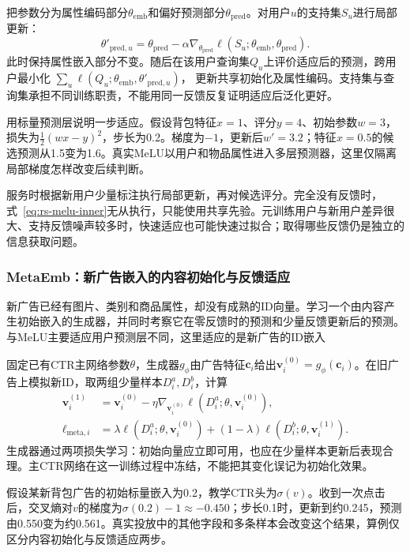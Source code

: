 把参数分为属性编码部分$\theta_{\mathrm{emb}}$和偏好预测部分$\theta_{\mathrm{pred}}$。对用户$u$的支持集$S_u$进行局部更新：
\begin{equation}
  \theta'_{\mathrm{pred},u}=
  \theta_{\mathrm{pred}}-\alpha\nabla_{\theta_{\mathrm{pred}}}
     \ell(S_u;\theta_{\mathrm{emb}},\theta_{\mathrm{pred}}).
  \label{eq:rs-melu-inner}
\end{equation}
此时保持属性嵌入部分不变。随后在该用户查询集$Q_u$上评价适应后的预测，跨用户最小化
$\sum_u\ell(Q_u;\theta_{\mathrm{emb}},\theta'_{\mathrm{pred},u})$，
更新共享初始化及属性编码。支持集与查询集承担不同训练职责，不能用同一反馈反复证明适应后泛化更好。

用标量预测层说明一步适应。假设背包特征$x=1$、评分$y=4$、初始参数$w=3$，损失为$\tfrac12(wx-y)^2$，步长为0.2。梯度为$-1$，更新后$w'=3.2$；特征$x=0.5$的候选预测从1.5变为1.6。真实MeLU以用户和物品属性进入多层预测器，这里仅隔离局部梯度怎样改变后续判断。

服务时根据新用户少量标注执行局部更新，再对候选评分。完全没有反馈时，式~\eqref{eq:rs-melu-inner}无从执行，只能使用共享先验。元训练用户与新用户差异很大、支持反馈噪声较多时，快速适应也可能快速过拟合；取得哪些反馈仍是独立的信息获取问题。

\subsubsection{MetaEmb：新广告嵌入的内容初始化与反馈适应}
\label{sec:rs-metaemb}

新广告已经有图片、类别和商品属性，却没有成熟的ID向量。学习一个由内容产生初始嵌入的生成器，并同时考察它在零反馈时的预测和少量反馈更新后的预测。与MeLU主要适应用户预测层不同，这里适应的是新广告的ID嵌入

固定已有CTR主网络参数$\theta$，生成器$g_\phi$由广告特征$\bm{c}_i$给出$\bm{v}^{(0)}_i=g_\phi(\bm{c}_i)$。在旧广告上模拟新ID，取两组少量样本$D_i^a,D_i^b$，计算
\begin{align}
  \bm{v}^{(1)}_i&=\bm{v}^{(0)}_i
      -\eta\nabla_{\bm{v}^{(0)}_i}\ell(D_i^a;\theta,\bm{v}^{(0)}_i),\\
  \ell_{\mathrm{meta},i}&=
     \lambda\ell(D_i^a;\theta,\bm{v}^{(0)}_i)
      +(1-\lambda)\ell(D_i^b;\theta,\bm{v}^{(1)}_i).
  \label{eq:rs-metaemb}
\end{align}
生成器通过两项损失学习：初始向量应立即可用，也应在少量样本更新后表现合理。主CTR网络在这一训练过程中冻结，不能把其变化误记为初始化效果。

假设某新背包广告的初始标量嵌入为0.2，教学CTR头为$\sigma(v)$。收到一次点击后，交叉熵对$v$的梯度为$\sigma(0.2)-1\approx-0.450$；步长0.1时，更新到约0.245，预测由0.550变为约0.561。真实投放中的其他字段和多条样本会改变这个结果，算例仅区分内容初始化与反馈适应两步。

